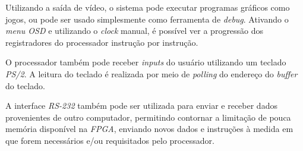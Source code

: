     { Utilizando a saída de vídeo, o sistema pode executar programas gráficos
        como jogos, ou pode ser usado simplesmente como ferramenta de \textit{debug}.
        Ativando o \textit{menu OSD} e utilizando o \textit{clock} manual, é
        possível ver a progressão dos registradores do processador instrução por
        instrução.
    }

    { O processador também pode receber \textit{inputs} do usuário utilizando
        um teclado \textit{PS/2}. A leitura do teclado é realizada por meio de
        \textit{polling} do endereço do \textit{buffer} do teclado.
    }

    { A interface \textit{RS-232} também pode ser utilizada para enviar e receber
        dados provenientes de outro computador, permitindo contornar a limitação
        de pouca memória disponível na \textit{FPGA}, enviando novos dados e
        instruções à medida em que forem necessários e/ou requisitados pelo
        processador.
    }

